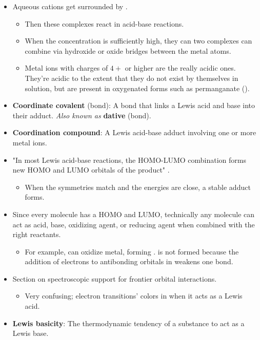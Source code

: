\documentclass[../notes.tex]{subfiles}
\begin{document}
\begin{itemize}
    \item Aqueous cations get surrounded by .
    \begin{itemize}
        \item Then these complexes react in acid-base reactions.
        \item When the concentration is sufficiently high, they can two complexes can combine via hydroxide or oxide bridges between the metal atoms.
        \item Metal ions with charges of $4+$ or higher are the really acidic ones. They're acidic to the extent that they do not exist by themselves in solution, but are present in oxygenated forms such as permanganate ().
    \end{itemize}
    \item \textbf{Coordinate covalent} (bond): A bond that links a Lewis acid and base into their adduct. \emph{Also known as} \textbf{dative} (bond).
    \item \textbf{Coordination compound}: A Lewis acid-base adduct involving one or more metal ions.
    \item "In most Lewis acid-base reactions, the HOMO-LUMO combination forms new HOMO and LUMO orbitals of the product" \parencite[186]{bib:MiesslerFischerTarr}.
    \begin{itemize}
        \item When the symmetries match and the energies are close, a stable adduct forms.
    \end{itemize}
    \item Since every molecule has a HOMO and LUMO, technically any molecule can act as acid, base, oxidizing agent, or reducing agent when combined with the right reactants.
    \begin{itemize}
        \item For example,  can oxidize  metal, forming .  is not formed because the addition of electrons to antibonding orbitals in  weakens one  bond.
    \end{itemize}
    \item {}Section on spectroscopic support for frontier orbital interactions.
    \begin{itemize}
        \item Very confusing; electron transitions' colors in  when it acts as a Lewis acid.
    \end{itemize}
    \item \textbf{Lewis basicity}: The thermodynamic tendency of a substance to act as a Lewis base.

\end{itemize}
\end{document}
